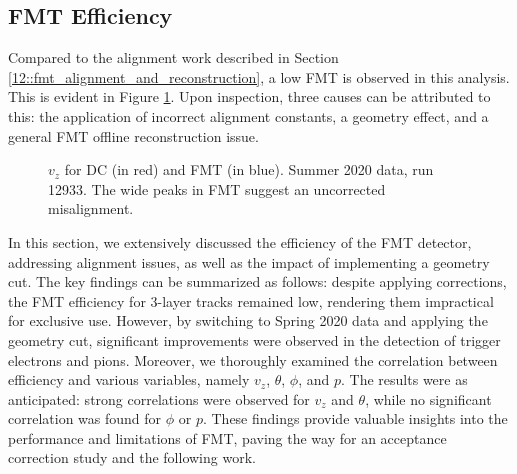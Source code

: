 \subsection{FMT Efficiency}
\label{14.10::fmt_efficiency}
    Compared to the alignment work described in Section \ref{12::fmt_alignment_and_reconstruction}, a low FMT is observed in this analysis.
    This is evident in Figure \ref{fig::14.10::vz_012933}.
    Upon inspection, three causes can be attributed to this: the application of incorrect alignment constants, a geometry effect, and a general FMT offline reconstruction issue.

    \begin{figure}[b!]
        \centering{}
        \caption[$v_z$ for DC and FMT, run 12933]{$v_z$ for DC (in red) and FMT (in blue). Summer 2020 data, run 12933. The wide peaks in FMT suggest an uncorrected misalignment.}
        \label{fig::14.10::vz_012933}
    \end{figure}

    In this section, we extensively discussed the efficiency of the FMT detector, addressing alignment issues, as well as the impact of implementing a geometry cut.
    The key findings can be summarized as follows: despite applying corrections, the FMT efficiency for 3-layer tracks remained low, rendering them impractical for exclusive use.
    However, by switching to Spring 2020 data and applying the geometry cut, significant improvements were observed in the detection of trigger electrons and pions.
    Moreover, we thoroughly examined the correlation between efficiency and various variables, namely $v_z$, $\theta$, $\phi$, and $p$.
    The results were as anticipated: strong correlations were observed for $v_z$ and $\theta$, while no significant correlation was found for $\phi$ or $p$.
    These findings provide valuable insights into the performance and limitations of FMT, paving the way for an acceptance correction study and the following work.

    
    
    
    
